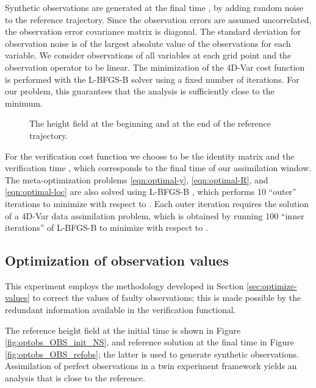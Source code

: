 \documentclass{article}
\begin{document}
Synthetic observations are generated at the final time , by adding random noise to the reference trajectory.
Since the observation errors are assumed uncorrelated, the observation error covariance matrix  is diagonal.
The standard deviation for observation noise is  of the largest absolute value of the observations for each variable.
We consider observations of all variables at each grid point and the observation operator  to be linear. 
The minimization of the 4D-Var cost function is performed with the 
L-BFGS-B solver \cite{zhu1997algorithm} using a fixed number of  iterations.
For our problem, this guarantees that the analysis is sufficiently close to the minimum.

\begin{figure}
\centering
{}
\caption{The height field  at the beginning and at the end of the reference trajectory.}
\label{fig:optobs_swetraj}
\end{figure}

For the verification cost function  we choose  to be the identity matrix and the verification time ,
which corresponds to the final time of our assimilation window.
The meta-optimization problems \eqref{eqn:optimal-y}, \eqref{eqn:optimal-R}, and \eqref{eqn:optimal-loc} are also solved using
 L-BFGS-B \cite{zhu1997algorithm}, which performs 10 ``outer'' iterations to minimize  with respect to . Each outer iteration requires
 the solution of a 4D-Var data assimilation problem, which is obtained by running 100 ``inner iterations''
 of L-BFGS-B to minimize  with respect to .




\subsection{Optimization of observation values}


This experiment employs the methodology developed in Section \ref{sec:optimize-values} to correct the
values of faulty observations; this is made possible by the redundant information available in the verification functional.

The reference height field  at the initial time is shown in Figure \ref{fig:optobs_OBS_init_NS},
and reference solution at the final time   in Figure \ref{fig:optobs_OBS_refobs}; the latter is
used to generate synthetic observations.
Assimilation of perfect observations in a twin experiment framework 
yields an analysis that is close to the reference.
\end{document}
